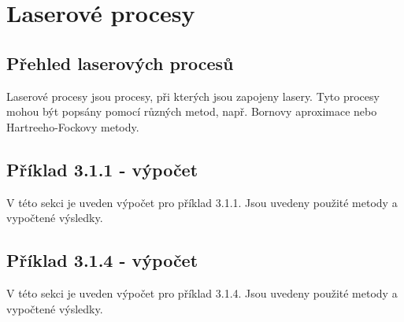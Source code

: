 \section{Laserové procesy}

\subsection{Přehled laserových procesů}

Laserové procesy jsou procesy, při kterých jsou zapojeny lasery. Tyto procesy mohou být popsány pomocí různých metod, např. Bornovy aproximace nebo Hartreeho-Fockovy metody.

\subsection{Příklad 3.1.1 - výpočet}
\begin{zadani}

\end{zadani}


V této sekci je uveden výpočet pro příklad 3.1.1. Jsou uvedeny použité metody a vypočtené výsledky.

\subsection{Příklad 3.1.4 - výpočet}
\begin{zadani}

\end{zadani}


V této sekci je uveden výpočet pro příklad 3.1.4. Jsou uvedeny použité metody a vypočtené výsledky.

